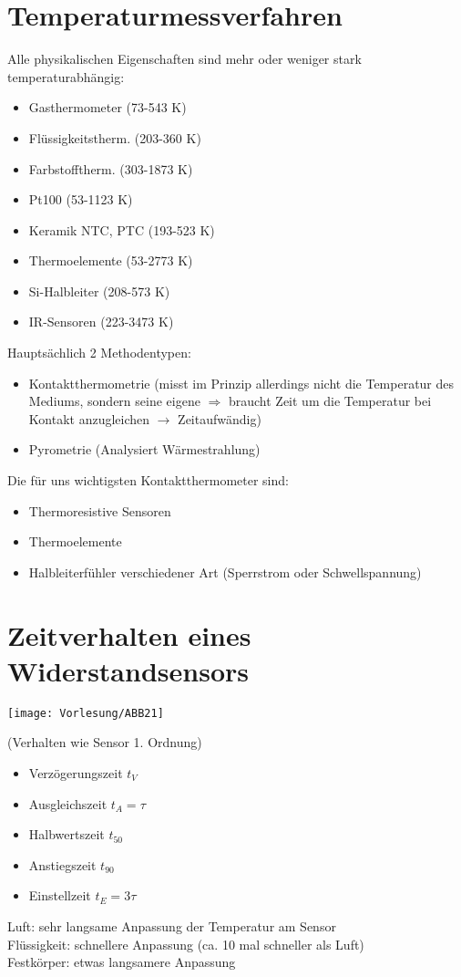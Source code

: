\documentclass{scrreprt}
\begin{document}
\section{Temperaturmessverfahren}
Alle physikalischen Eigenschaften sind mehr oder weniger stark temperaturabhängig:
\begin{itemize}
\item Gasthermometer (73-543 K)
\item Flüssigkeitstherm. (203-360 K)
\item Farbstofftherm. (303-1873 K)
\item Pt100 (53-1123 K)
\item Keramik NTC, PTC (193-523 K)
\item Thermoelemente (53-2773 K)
\item Si-Halbleiter (208-573 K)
\item IR-Sensoren (223-3473 K)
\end{itemize}
Hauptsächlich 2 Methodentypen:
\begin{itemize}
\item Kontaktthermometrie (misst im Prinzip allerdings nicht die Temperatur des Mediums, sondern seine eigene $\Rightarrow$ braucht Zeit um die Temperatur bei Kontakt anzugleichen $\to$ Zeitaufwändig)
\item Pyrometrie (Analysiert Wärmestrahlung)
\end{itemize}
Die für uns wichtigsten Kontaktthermometer sind:
\begin{itemize}
\item Thermoresistive Sensoren
\item Thermoelemente
\item Halbleiterfühler verschiedener Art (Sperrstrom oder Schwellspannung)
\end{itemize}
\section{Zeitverhalten eines Widerstandsensors}
\begin{center}
\texttt{[image: Vorlesung/ABB21]}
\end{center}
(Verhalten wie Sensor 1. Ordnung)
\begin{itemize}
\item Verzögerungszeit $t_V$
\item Ausgleichszeit $t_A = \tau$
\item Halbwertszeit $t_{50}$
\item Anstiegszeit $t_{90}$
\item Einstellzeit $t_E=3 \tau$
\end{itemize}
Luft: sehr langsame Anpassung der Temperatur am Sensor\\
Flüssigkeit: schnellere Anpassung (ca. 10 mal schneller als Luft)\\
Festkörper: etwas langsamere Anpassung
\end{document}
